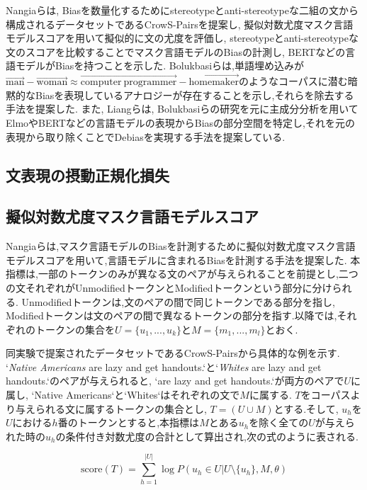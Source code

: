 \documentclass[
  platex, dvipdfmx %
]{nlp2021}
\begin{document}
Nangiaら\cite{nangia2020crows}は, Biasを数量化するためにstereotypeとanti-stereotypeな二組の文から構成されるデータセットであるCrowS-Pairsを提案し, 擬似対数尤度マスク言語モデルスコア\cite{salazar-etal-2020-masked}を用いて擬似的に文の尤度を評価し, stereotypeとanti-stereotypeな文のスコアを比較することでマスク言語モデルのBiasの計測し, BERTなどの言語モデルがBiasを持つことを示した.
Bolukbasiら\cite{bolukbasi2016man}は,単語埋め込みが$\overrightarrow{\mathrm{man}}-\overrightarrow{\mathrm{woman}} \approx \overrightarrow{\mathrm{computer\ programmer}}-\overrightarrow{\mathrm{homemaker}}$のようなコーパスに潜む暗黙的なBiasを表現しているアナロジーが存在することを示し,それらを除去する手法を提案した.
また, Liangら\cite{liang-etal-2020-towards}は, Bolukbasiらの研究を元に主成分分析を用いてElmoやBERTなどの言語モデルの表現からBiasの部分空間を特定し,それを元の表現から取り除くことでDebiasを実現する手法を提案している.

\subsection{文表現の摂動正規化損失}

\subsection{擬似対数尤度マスク言語モデルスコア}
Nangiaら\cite{nangia2020crows}は,マスク言語モデルのBiasを計測するために擬似対数尤度マスク言語モデルスコア\cite{salazar-etal-2020-masked}を用いて,言語モデルに含まれるBiasを計測する手法を提案した.
本指標は,一部のトークンのみが異なる文のペアが与えられることを前提とし,二つの文それぞれがUnmodifiedトークンとModifiedトークンという部分に分けられる. Unmodifiedトークンは,文のペアの間で同じトークンである部分を指し, Modifiedトークンは文のペアの間で異なるトークンの部分を指す.以降では,それぞれのトークンの集合を$U = \{u_1, ..., u_k\}$と$M = \{m_1, ..., m_l\}$とおく.

同実験で提案されたデータセットであるCrowS-Pairsから具体的な例を示す. `\emph{Native Americans} are lazy and get handouts.`と`\emph{Whites} are lazy and get handouts.`のペアが与えられると, `are lazy and get handouts.`が両方のペアで$U$に属し, `Native Americans`と`Whites`はそれぞれの文で$M$に属する.
$T$をコーパスより与えられる文に属するトークンの集合とし, $T = (U \cup M)$とする.そして, $u_h$を$U$における$h$番のトークンとすると,本指標は$M$とある$u_h$を除く全ての$U$が与えられた時の$u_h$の条件付き対数尤度の合計として算出され,次の式のように表される.

\begin{equation}
\mathrm{score}(T) = \sum_{h=1}^{|U|}{\log{P(u_h \in U | U \setminus \{u_h\}, M, \theta)}}
\label{eq:pseudo_log_likelihood}
\end{equation}
\end{document}
